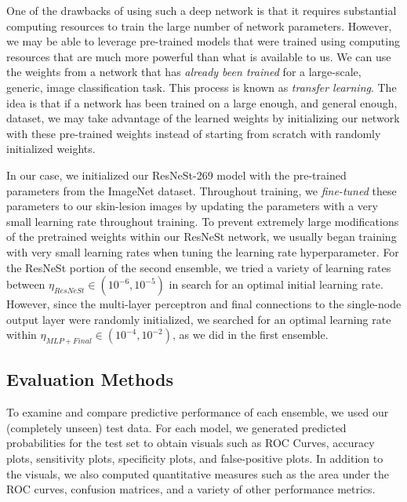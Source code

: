 \documentclass [MAS] {uclathes}
\begin{document}
One of the drawbacks of using such a deep network is that it requires substantial computing resources to train the large number of network parameters. However, we may be able to leverage pre-trained models that were trained using computing resources that are much more powerful than what is available to us. We can use the weights from a network that has \textit{already been trained} for a large-scale, generic, image classification task. This process is known as \textit{transfer learning}. The idea is that if a network has been trained on a large enough, and general enough, dataset, we may take advantage of the learned weights by initializing our network with these pre-trained weights instead of starting from scratch with randomly initialized weights. 

In our case, we initialized our ResNeSt-269 model with the pre-trained parameters from the ImageNet dataset. Throughout training, we \textit{fine-tuned} these parameters to our skin-lesion images by updating the parameters with a very small learning rate throughout training. To prevent extremely large modifications of the pretrained weights within our ResNeSt network, we usually began training with very small learning rates when tuning the learning rate hyperparameter. For the ResNeSt portion of the second ensemble, we tried a variety of learning rates between $\eta_{ResNeSt} \in (10^{-6}, 10^{-5})$ in search for an optimal initial learning rate. However, since the multi-layer perceptron and final connections to the single-node output layer were randomly initialized, we searched for an optimal learning rate within $\eta_{MLP + Final} \in (10^{-4}, 10^{-2})$, as we did in the first ensemble. 


\subsection{Evaluation Methods}

To examine and compare predictive performance of each ensemble, we used our (completely unseen) test data. For each model, we generated predicted probabilities for the test set to obtain visuals such as ROC Curves, accuracy plots, sensitivity plots, specificity plots, and false-positive plots. In addition to the visuals, we also computed quantitative measures such as the area under the ROC curves, confusion matrices, and a variety of other performance metrics. 
\end{document}
